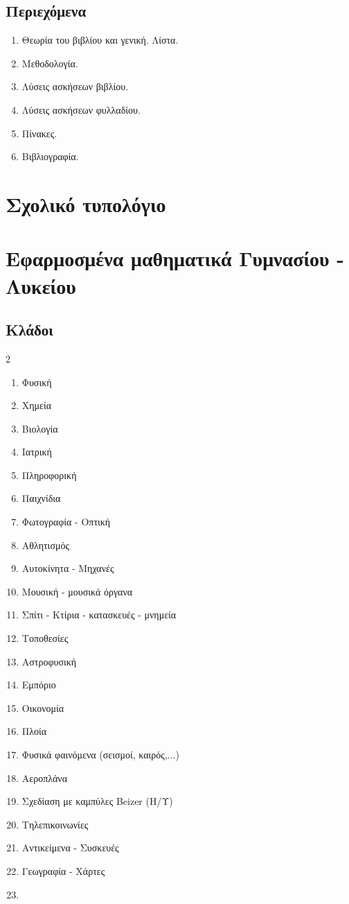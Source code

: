 \documentclass[11pt,a4paper]{book}
\begin{document}
\subsection{Περιεχόμενα}
\begin{enumerate}
\item Θεωρία του βιβλίου και γενική. Λίστα.
\item Μεθοδολογία.
\item Λύσεις ασκήσεων βιβλίου.
\item Λύσεις ασκήσεων φυλλαδίου.
\item Πίνακες.
\item Βιβλιογραφία.
\end{enumerate}
\section{Σχολικό τυπολόγιο}
\section{Εφαρμοσμένα μαθηματικά Γυμνασίου - Λυκείου}
\subsection{Κλάδοι}
\begin{multicols}{2}
\begin{enumerate}
\item Φυσική
\item Χημεία
\item Βιολογία
\item Ιατρική
\item Πληροφορική
\item Παιχνίδια
\item Φωτογραφία - Οπτική
\item Αθλητισμός
\item Αυτοκίνητα - Μηχανές
\item Μουσική - μουσικά όργανα
\item Σπίτι - Κτίρια - κατασκευές - μνημεία
\item Τοποθεσίες
\item Αστροφυσική
\item Εμπόριο
\item Οικονομία
\item Πλοία
\item Φυσικά φαινόμενα (σεισμοί, καιρός,...)
\item Αεροπλάνα
\item Σχεδίαση με καμπύλες Beizer (Η/Υ)
\item Τηλεπικοινωνίες
\item Αντικείμενα - Συσκευές
\item Γεωγραφία - Χάρτες
\item 
\end{enumerate}
\end{multicols}
\end{document}
